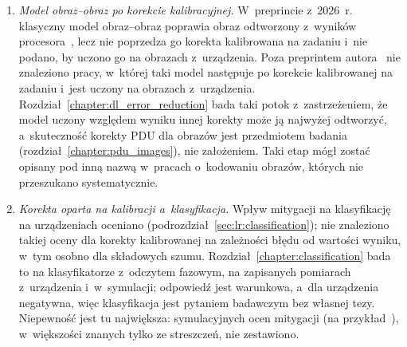\begin{enumerate}
Poza nimi takiego zestawienia w~przeszukanym zakresie nie znaleziono; część prac znano tylko ze streszczeń.
\item\label{itm:lr:gap:c} \emph{Model obraz--obraz po korekcie kalibracyjnej.}
W~preprincie z~2026~r. klasyczny model obraz--obraz poprawia obraz odtworzony z~wyników procesora~\cite{jadhav_image_2026}, lecz nie poprzedza go korekta kalibrowana na zadaniu i~nie podano, by uczono go na obrazach z~urządzenia.
Poza preprintem autora~\cite{werner_deep_learning_manuscript} nie znaleziono pracy, w~której taki model następuje po korekcie kalibrowanej na zadaniu i~jest uczony na obrazach z~urządzenia.
Rozdział~\ref{chapter:dl_error_reduction} bada taki potok z~zastrzeżeniem, że model uczony względem wyniku innej korekty może ją najwyżej odtworzyć, a~skuteczność korekty PDU dla obrazów jest przedmiotem badania (rozdział~\ref{chapter:pdu_images}), nie założeniem.
Taki etap mógł zostać opisany pod inną nazwą w~pracach o~kodowaniu obrazów, których nie przeszukano systematycznie.
\item\label{itm:lr:gap:d} \emph{Korekta oparta na kalibracji a~klasyfikacja.}
Wpływ mitygacji na klasyfikację na urządzeniach oceniano (podrozdział~\ref{sec:lr:classification}); nie znaleziono takiej oceny dla korekty kalibrowanej na zależności błędu od wartości wyniku, w~tym osobno dla składowych szumu.
Rozdział~\ref{chapter:classification} bada to na klasyfikatorze z~odczytem fazowym, na zapisanych pomiarach z~urządzenia i~w~symulacji; odpowiedź jest warunkowa, a~dla urządzenia negatywna, więc klasyfikacja jest pytaniem badawczym bez własnej tezy.
Niepewność jest tu największa: symulacyjnych ocen mitygacji (na przykład~\cite{li_ensemble-learning_2024}), w~większości znanych tylko ze streszczeń, nie zestawiono.
\end{enumerate}


